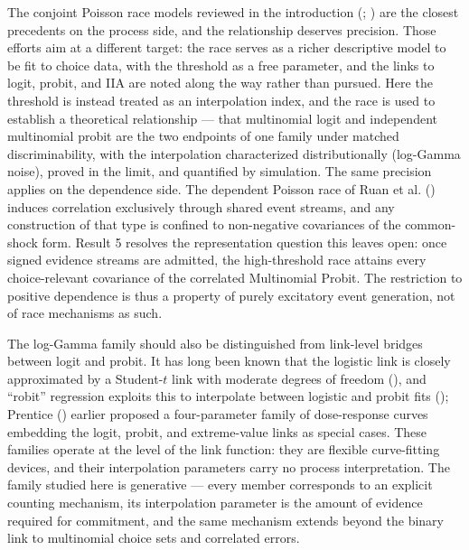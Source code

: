 \documentclass[
  man,
  floatsintext,
  longtable,
  a4paper,
  nolmodern,
  notxfonts,
  notimes,
  colorlinks=true,linkcolor=blue,citecolor=blue,urlcolor=blue]{apa7}
\begin{document}
The conjoint Poisson race models reviewed in the introduction
(;
) are the
closest precedents on the process side, and the relationship deserves
precision. Those efforts aim at a different target: the race serves as a
richer descriptive model to be fit to choice data, with the threshold as
a free parameter, and the links to logit, probit, and IIA are noted
along the way rather than pursued. Here the threshold is instead treated
as an interpolation index, and the race is used to establish a
theoretical relationship --- that multinomial logit and independent
multinomial probit are the two endpoints of one family under matched
discriminability, with the interpolation characterized distributionally
(log-Gamma noise), proved in the limit, and quantified by simulation.
The same precision applies on the dependence side. The dependent Poisson
race of Ruan et al. ()
induces correlation exclusively through shared event streams, and any
construction of that type is confined to non-negative covariances of the
common-shock form. Result 5 resolves the representation question this
leaves open: once signed evidence streams are admitted, the
high-threshold race attains every choice-relevant covariance of the
correlated Multinomial Probit. The restriction to positive dependence is
thus a property of purely excitatory event generation, not of race
mechanisms as such.

The log-Gamma family should also be distinguished from link-level
bridges between logit and probit. It has long been known that the
logistic link is closely approximated by a Student-\(t\) link with
moderate degrees of freedom
(), and ``robit'' regression exploits this to interpolate between
logistic and probit fits
(); Prentice
() earlier
proposed a four-parameter family of dose-response curves embedding the
logit, probit, and extreme-value links as special cases. These families
operate at the level of the link function: they are flexible
curve-fitting devices, and their interpolation parameters carry no
process interpretation. The family studied here is generative --- every
member corresponds to an explicit counting mechanism, its interpolation
parameter is the amount of evidence required for commitment, and the
same mechanism extends beyond the binary link to multinomial choice sets
and correlated errors.
\end{document}
